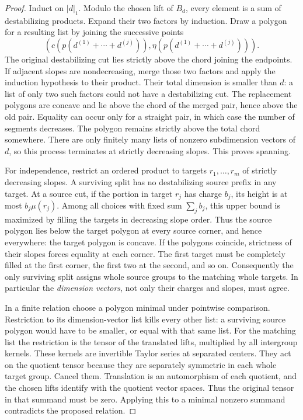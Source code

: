 \begin{proof}
Induct on $|d|_1$.  Modulo the chosen lift of $B_d$, every element is a
sum of destabilizing products.  Expand their two factors by induction.
Draw a polygon for a resulting list by joining the successive points
\[
 \left(c(p(d^{(1)}+\cdots+d^{(j)})),
       \eta(p(d^{(1)}+\cdots+d^{(j)}))\right).
\]
The original destabilizing cut lies strictly above the chord joining
the endpoints.  If adjacent slopes are nondecreasing, merge those two
factors and apply the induction hypothesis to their product.  Their
total dimension is smaller than $d$: a list of only two such factors
could not have a destabilizing cut.  The replacement polygons are
concave and lie above the chord of the merged pair, hence above the
old pair.  Equality can occur only for a straight pair, in which case
the number of segments decreases.  The polygon remains strictly above
the total chord somewhere.  There are only finitely many lists of
nonzero subdimension vectors of $d$, so this process terminates at
strictly decreasing slopes.  This proves spanning.

For independence, restrict an ordered product to targets
$r_1,\ldots,r_m$ of strictly decreasing slopes.  A surviving split has
no destabilizing source prefix in any target.  At a source cut, if
the portion in target $r_j$ has charge $b_j$, its height is at most
$b_j\mu(r_j)$.  Among all choices with fixed sum $\sum_jb_j$, this
upper bound is maximized by filling the targets in decreasing slope
order.  Thus the source polygon lies below the target polygon at
every source corner, and hence everywhere: the target polygon is
concave.  If the polygons coincide, strictness of their slopes forces
equality at each corner.  The first target must be completely filled
at the first corner, the first two at the second, and so on.
Consequently the only surviving split assigns whole source groups to
the matching whole targets.  In particular the \emph{dimension
vectors}, not only their charges and slopes, must agree.

In a finite relation choose a polygon minimal under pointwise
comparison.  Restriction to its dimension-vector list kills every
other list: a surviving source polygon would have to be smaller, or
equal with that same list.  For the matching list the restriction is
the tensor of the translated lifts, multiplied by all intergroup
kernels.  These kernels are invertible Taylor series at separated
centers.  They act on the quotient tensor because they are separately
symmetric in each whole target group.  Cancel them.  Translation is
an automorphism of each quotient, and the chosen lifts identify with
the quotient vector spaces.  Thus the original tensor in that summand
must be zero.  Applying this to a minimal nonzero summand contradicts
the proposed relation.
\end{proof}

